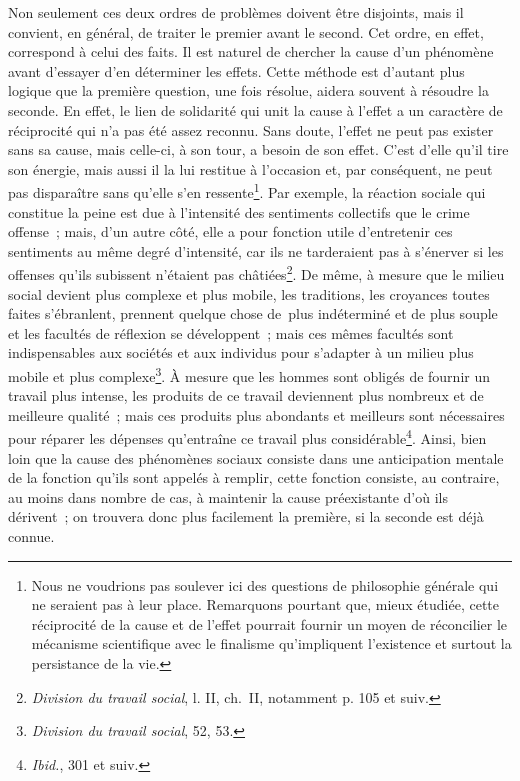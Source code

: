 \documentclass[french,twoside]{book} %
\begin{document}
Non seulement ces deux ordres de problèmes doivent être disjoints, mais il convient, en général, de traiter le premier avant le second. Cet ordre, en effet, correspond à celui des faits. Il est naturel de chercher la cause d’un phénomène avant d’essayer d’en déterminer les effets. Cette méthode est d’autant plus logique que la première question, une fois résolue, aidera souvent à résoudre la seconde. En effet, le lien de solidarité qui unit la cause à l’effet a un caractère de réciprocité qui n’a pas été assez reconnu. Sans doute, l’effet ne peut pas exister sans sa cause, mais celle-ci, à son tour, a besoin de son effet. C’est d’elle qu’il tire son énergie, mais aussi il la lui restitue à l’occasion et, par conséquent, ne peut pas disparaître sans qu’elle s’en ressente\footnote{ Nous ne voudrions pas soulever ici des questions de philosophie générale qui ne seraient pas à leur place. Remarquons pourtant que, mieux étudiée, cette réciprocité de la cause et de l’effet pourrait fournir un moyen de réconcilier le mécanisme scientifique avec le finalisme qu’impliquent l’existence et surtout la persistance de la vie.}. Par exemple, la réaction sociale qui constitue la peine est due à l’intensité des sentiments collectifs que le crime offense ; mais, d’un autre côté, elle a pour fonction utile d’entretenir ces sentiments au même degré d’intensité, car ils ne tarderaient pas à s’énerver si les offenses qu’ils subissent n’étaient pas châtiées\footnote{\emph{Division du travail social}, l. II, ch. II, notamment p. 105 et suiv.}. De même, à mesure que le milieu social devient plus complexe et plus mobile, les traditions, les croyances toutes faites s’ébranlent, prennent quelque chose de plus indéterminé et de plus souple et les facultés de réflexion se développent ; mais ces mêmes facultés sont indispensables aux sociétés et aux individus pour s’adapter à un milieu plus mobile et plus complexe\footnote{\emph{Division du travail social}, 52, 53.}. À mesure que les hommes sont obligés de fournir un travail plus intense, les produits de ce travail deviennent plus nombreux et de meilleure qualité ; mais ces produits plus abondants et meilleurs sont nécessaires pour réparer les dépenses qu’entraîne ce travail plus considérable\footnote{{\itshape Ibid.}, 301 et suiv.}. Ainsi, bien loin que la cause des phénomènes sociaux consiste dans une anticipation mentale de la fonction qu’ils sont appelés à remplir, cette fonction consiste, au contraire, au moins dans nombre de cas, à maintenir la cause préexistante d’où ils dérivent ; on trouvera donc plus facilement la première, si la seconde est déjà connue.\par
\end{document}
